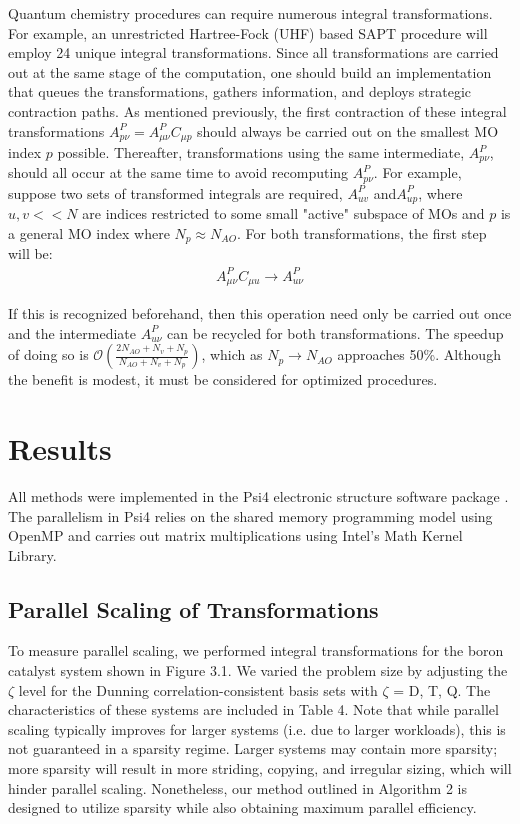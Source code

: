 Quantum chemistry procedures can require numerous integral transformations. For example, an unrestricted Hartree-Fock (UHF) based SAPT
procedure will employ
24 unique integral transformations. Since all transformations are carried out at the same stage of the computation, one should build an 
implementation that queues the transformations, gathers information, and deploys strategic contraction paths.
As mentioned previously, the first contraction of these integral transformations $A_{p \nu}^P=A_{\mu \nu}^PC_{\mu p}$ 
should always be carried out on the smallest MO index $p$ 
possible. Thereafter, transformations using the same intermediate, $A_{p \nu}^P$, should all occur at the same time to avoid
recomputing $A_{p \nu}^P$. 
For example, suppose two sets of transformed integrals are required, $A^P_{u v}$ and$A^P_{up}$, where $u,v << N$ are
indices restricted to some small "active" subspace of MOs
and $p$ is a general MO index where $N_p \approx N_{AO}$. For both transformations, the first step will be:
\begin{align} 
A^P_{\mu \nu}C_{\mu u} \rightarrow A^P_{u \nu} 
\end{align}

\noindent If this is recognized beforehand, then this operation need only be carried out once and 
the intermediate $A^P_{u \nu}$ can be recycled
for both transformations. The speedup of doing so is $\mathcal{O}(\frac{2N_{AO} + N_v + N_p}{N_{AO} + N_v + N_p})$, 
which as $N_p \rightarrow N_{AO}$ approaches
50\%. Although the benefit is modest, it must be considered for optimized procedures.

\section{Results}

All methods were implemented in the {\sc Psi4} electronic structure software package \cite{Parrish:2017:3185}.
The parallelism in {\sc Psi4} relies on the shared memory programming model using OpenMP 
and carries out matrix multiplications using Intel's Math Kernel
Library. 


\subsection{Parallel Scaling of Transformations}

To measure parallel scaling, we performed integral transformations for the boron catalyst system shown in Figure 3.1. 
We varied the problem size by adjusting the $\zeta$ level for the Dunning correlation-consistent basis sets with $\zeta$ = D, T, Q.
The characteristics of these systems are included in Table 4. Note that while parallel scaling typically improves
for larger systems (i.e. due to larger workloads),
this is not guaranteed in a sparsity regime. Larger systems may contain more sparsity;
more sparsity will result in more striding, copying, and irregular sizing,
which will hinder parallel scaling. Nonetheless, our method outlined in Algorithm 2 is designed to utilize sparsity while also
obtaining maximum parallel efficiency. 

